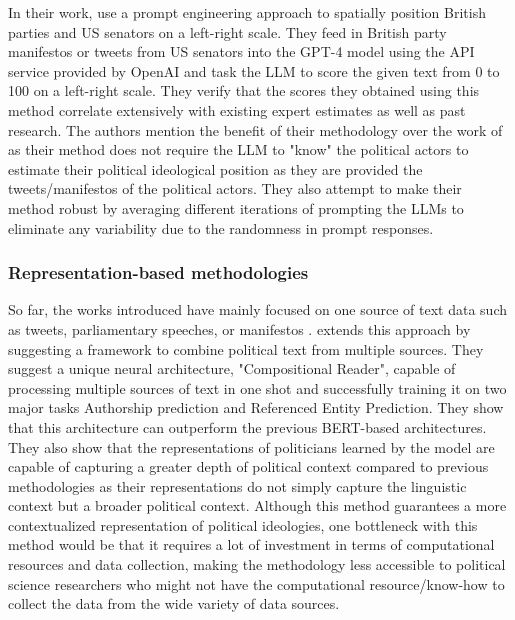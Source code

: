 \documentclass[final,5p,times,twocolumn,authoryear]{elsarticle}
\begin{document}
In their work, \citeauthor{Scaling-Political-Texts-with-ChatGPT} use a prompt engineering approach to spatially position British parties and US senators on a left-right scale. They feed in British party manifestos or tweets from US senators into the GPT-4 model using the API service provided by OpenAI and task the LLM to score the given text from 0 to 100 on a left-right scale. They verify that the scores they obtained using this method correlate extensively with existing expert estimates as well as past research. The authors mention the benefit of their methodology over the work of \citeauthor{llm-latent-position-of-politicians} as their method does not require the LLM to "know" the political actors to estimate their political ideological position as they are provided the tweets/manifestos of the political actors. They also attempt to make their method robust by averaging different iterations of prompting the LLMs to eliminate any variability due to the randomness in prompt responses.  

\subsubsection{Representation-based methodologies}
So far, the works introduced have mainly focused on one source of text data such as tweets, parliamentary speeches, or manifestos \citeauthor{Understanding-Politics-via-Contextualized}. extends this approach by suggesting a framework to combine political text from multiple sources. They suggest a unique neural architecture, "Compositional Reader", capable of processing multiple sources of text in one shot and successfully training it on two major tasks Authorship prediction and Referenced Entity Prediction. They show that this architecture can outperform the previous BERT-based architectures. They also show that the representations of politicians learned by the model are capable of capturing a greater depth of political context compared to previous methodologies as their representations do not simply capture the linguistic context but a broader political context. Although this method guarantees a more contextualized representation of political ideologies, one bottleneck with this method would be that it requires a lot of investment in terms of computational resources and data collection, making the methodology less accessible to political science researchers who might not have the computational resource/know-how to collect the data from the wide variety of data sources.
\end{document}
